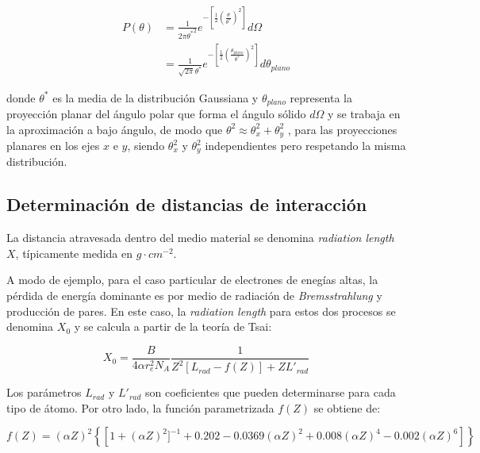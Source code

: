 \begin{equation}
 \begin{split}
  P(\theta) &= \frac{1}{2 \pi {\theta^{*}}^{2}} e^{-\left[\frac{1}{2}\left(\frac{\theta}{\theta^{*}}\right)^{2}\right]} d\Omega \\
	    &= \frac{1}{\sqrt{2 \pi} \theta^{*}} e^{-\left[\frac{1}{2}\left(\frac{\theta_{plano}}{\theta^{*}}\right)^{2}\right]} d\theta_{plano}
 \end{split}
\end{equation}

\noindent
donde $\theta^{*}$ es la media de la distribución Gaussiana y $\theta_{plano}$ representa la proyección planar del ángulo polar que forma el ángulo sólido $d\Omega$ y se trabaja en la aproximación a bajo ángulo, de modo que $\theta^{2} \approx \theta_{x}^{2} + \theta_{y}^{2}$ , para las proyecciones planares en los ejes $x$ e $y$, siendo $\theta_{x}^{2}$ y $\theta_{y}^{2}$ independientes pero respetando la misma distribución.

\subsection{Determinaci\'on de distancias de interacci\'on}

La distancia atravesada dentro del medio material se denomina \emph{radiation length} $X$, típicamente medida en $g \cdot cm^{-2}$.

A modo de ejemplo, para el caso particular de electrones de enegías altas, la pérdida de energía dominante es por medio de radiación de \emph{Bremsstrahlung} y producción de pares. En este caso, la \emph{radiation length} para estos dos procesos se denomina $X_{0}$ y se calcula a partir de la teoría de Tsai:

\begin{equation}
 X_{0} = \frac{B}{4 \alpha r_{e}^{2} N_{A}} \frac{1}{Z^{2}[L_{rad} - f(Z)] + Z L'_{rad}}
\end{equation}

Los parámetros $L_{rad}$ y $L'_{rad}$ son coeficientes que pueden determinarse para cada tipo de átomo. Por otro lado, la función parametrizada $f(Z)$ se obtiene de:

\begin{equation}
 f(Z) = (\alpha Z)^{2} \left\{
			\left[1 + (\alpha Z)^{2}]^{-1} + 0.202 - 0.0369 (\alpha Z)^{2} + 0.008 (\alpha Z)^{4} - 0.002 (\alpha Z)^{6} \right]
		       \right\}
\end{equation}

